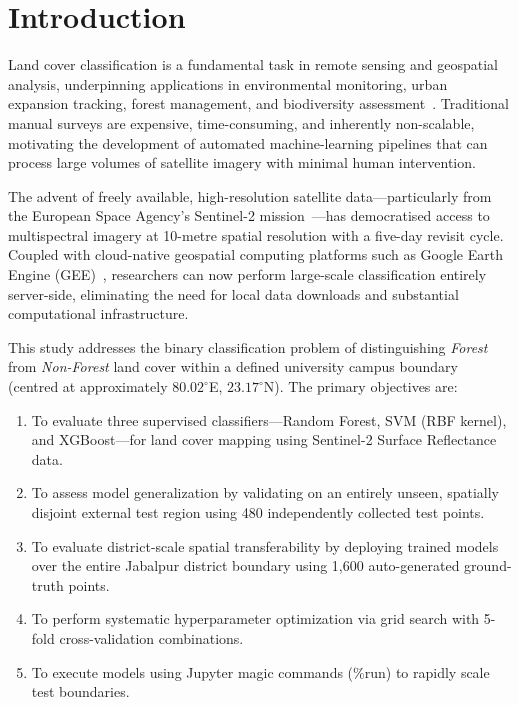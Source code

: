 \documentclass[12pt, a4paper, twocolumn]{article}
\begin{document}
\twocolumn

\section{Introduction}
\label{sec:introduction}

Land cover classification is a fundamental task in remote sensing and geospatial analysis, underpinning applications in environmental monitoring, urban expansion tracking, forest management, and biodiversity assessment~\cite{lu2007survey}. Traditional manual surveys are expensive, time-consuming, and inherently non-scalable, motivating the development of automated machine-learning pipelines that can process large volumes of satellite imagery with minimal human intervention.

The advent of freely available, high-resolution satellite data---particularly from the European Space Agency's Sentinel-2 mission~\cite{drusch2012sentinel}---has democratised access to multispectral imagery at 10-metre spatial resolution with a five-day revisit cycle. Coupled with cloud-native geospatial computing platforms such as Google Earth Engine (GEE)~\cite{gorelick2017google}, researchers can now perform large-scale classification entirely server-side, eliminating the need for local data downloads and substantial computational infrastructure.

This study addresses the binary classification problem of distinguishing \textit{Forest} from \textit{Non-Forest} land cover within a defined university campus boundary (centred at approximately $80.02^{\circ}$E, $23.17^{\circ}$N). The primary objectives are:

\begin{enumerate}[label=(\roman*)]
    \item To evaluate three supervised classifiers---Random Forest, SVM (RBF kernel), and XGBoost---for land cover mapping using Sentinel-2 Surface Reflectance data.
    \item To assess model generalization by validating on an entirely unseen, spatially disjoint external test region using 480 independently collected test points.
    \item To evaluate district-scale spatial transferability by deploying trained models over the entire Jabalpur district boundary using 1,600 auto-generated ground-truth points.
    \item To perform systematic hyperparameter optimization via grid search with 5-fold cross-validation combinations.
    \item To execute models using Jupyter magic commands (\%run) to rapidly scale test boundaries.
\end{enumerate}
\end{document}
